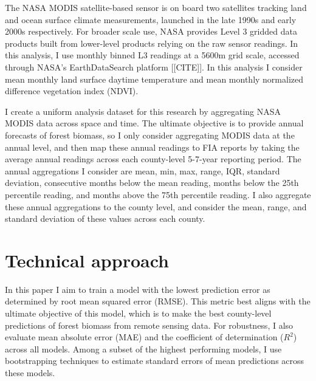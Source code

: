 \documentclass{article}
\begin{document}
The NASA MODIS satellite-based sensor is on board two satellites tracking land and ocean surface climate measurements, launched in the late 1990s and early 2000s respectively. For broader scale use, NASA provides Level 3 gridded data products built from lower-level products relying on the raw sensor readings. In this analysis, I use monthly binned L3 readings at a 5600m grid scale, accessed through NASA's EarthDataSearch platform [[CITE]]. In this analysis I consider mean monthly land surface daytime temperature and mean monthly normalized difference vegetation index (NDVI).

I create a uniform analysis dataset for this research by aggregating NASA MODIS data across space and time. The ultimate objective is to provide annual forecasts of forest biomass, so I only consider aggregating MODIS data at the annual level, and then map these annual readings to FIA reports by taking the average annual readings across each county-level 5-7-year reporting period. The annual aggregations I consider are mean, min, max, range, IQR, standard deviation, consecutive months below the mean reading, months below the 25th percentile reading, and months above the 75th percentile reading. I also aggregate these annual aggregations to the county level, and consider the mean, range, and standard deviation of these values across each county.

\section{Technical approach}

In this paper I aim to train a model with the lowest prediction error as determined by root mean squared error (RMSE). This metric best aligns with the ultimate objective of this model, which is to make the best county-level predictions of forest biomass from remote sensing data. For robustness, I also evaluate mean absolute error (MAE) and the coefficient of determination ($R^2$) across all models. Among a subset of the highest performing models, I use bootstrapping techniques to estimate standard errors of mean predictions across these models. 
\end{document}
